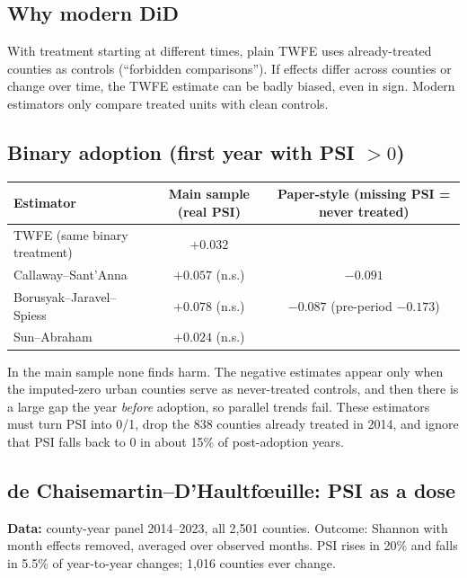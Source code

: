 \documentclass[11pt]{article}
\begin{document}
\subsection{Why modern DiD}
With treatment starting at different times, plain TWFE uses already-treated counties as controls (``forbidden comparisons''). If effects differ across counties or change over time, the TWFE estimate can be badly biased, even in sign. Modern estimators only compare treated units with clean controls.

\subsection{Binary adoption (first year with PSI $>0$)}
\begin{center}\small
\begin{tabular}{lcc}
\toprule
Estimator & Main sample (real PSI) & Paper-style (missing PSI = never treated) \\
\midrule
TWFE (same binary treatment) & $+0.032$ & \\
Callaway--Sant'Anna & $+0.057$ (n.s.) & $-0.091$ \\
Borusyak--Jaravel--Spiess & $+0.078$ (n.s.) & $-0.087$ (pre-period $-0.173$) \\
Sun--Abraham & $+0.024$ (n.s.) & \\
\bottomrule
\end{tabular}
\end{center}
In the main sample none finds harm. The negative estimates appear only when the imputed-zero urban counties serve as never-treated controls, and then there is a large gap the year \emph{before} adoption, so parallel trends fail. These estimators must turn PSI into 0/1, drop the 838 counties already treated in 2014, and ignore that PSI falls back to 0 in about 15\% of post-adoption years.

\subsection{de Chaisemartin--D'Haultf\oe uille: PSI as a dose}
\textbf{Data:} county-year panel 2014--2023, all 2,501 counties. Outcome: Shannon with month effects removed, averaged over observed months. PSI rises in 20\% and falls in 5.5\% of year-to-year changes; 1,016 counties ever change.
\end{document}
